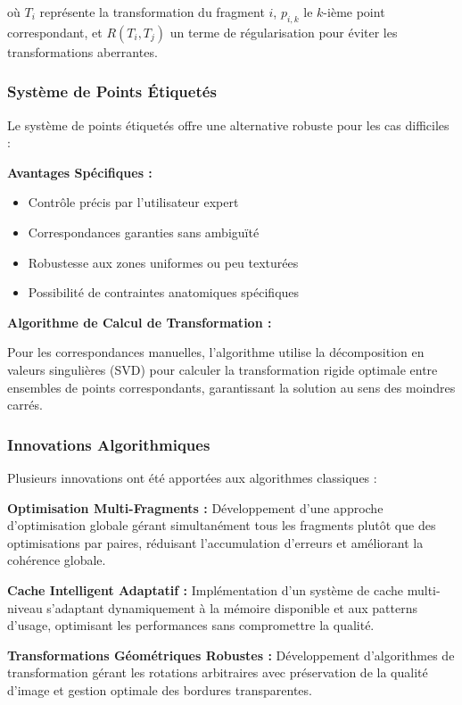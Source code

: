 \documentclass[12pt,a4paper]{article}
\begin{document}
où $T_i$ représente la transformation du fragment $i$, $p_{i,k}$ le $k$-ième point correspondant, et $R(T_i, T_j)$ un terme de régularisation pour éviter les transformations aberrantes.

\subsubsection{Système de Points Étiquetés}

Le système de points étiquetés offre une alternative robuste pour les cas difficiles :

\textbf{Avantages Spécifiques :}
\begin{itemize}
\item Contrôle précis par l'utilisateur expert
\item Correspondances garanties sans ambiguïté
\item Robustesse aux zones uniformes ou peu texturées
\item Possibilité de contraintes anatomiques spécifiques
\end{itemize}

\textbf{Algorithme de Calcul de Transformation :}

Pour les correspondances manuelles, l'algorithme utilise la décomposition en valeurs singulières (SVD) pour calculer la transformation rigide optimale entre ensembles de points correspondants, garantissant la solution au sens des moindres carrés.

\subsubsection{Innovations Algorithmiques}

Plusieurs innovations ont été apportées aux algorithmes classiques :

\textbf{Optimisation Multi-Fragments :}
Développement d'une approche d'optimisation globale gérant simultanément tous les fragments plutôt que des optimisations par paires, réduisant l'accumulation d'erreurs et améliorant la cohérence globale.

\textbf{Cache Intelligent Adaptatif :}
Implémentation d'un système de cache multi-niveau s'adaptant dynamiquement à la mémoire disponible et aux patterns d'usage, optimisant les performances sans compromettre la qualité.

\textbf{Transformations Géométriques Robustes :}
Développement d'algorithmes de transformation gérant les rotations arbitraires avec préservation de la qualité d'image et gestion optimale des bordures transparentes.
\end{document}
